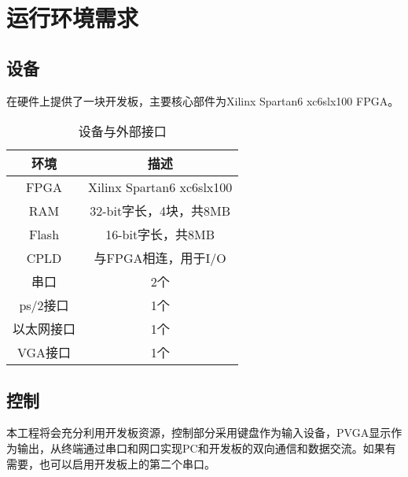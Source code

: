 \section{运行环境需求}
\subsection{设备}
在硬件上提供了一块开发板，主要核心部件为Xilinx Spartan6 xc6slx100 FPGA。
\begin{table}[H]
	\centering
	\caption{设备与外部接口}
	\begin{tabular}{|c|c|}
		\hline
		环境 & 描述 \\
		\hline
		FPGA & Xilinx Spartan6 xc6slx100 \\
		\hline
		RAM & 32-bit字长，4块，共8MB \\
		\hline
		Flash & 16-bit字长，共8MB \\
		\hline
		CPLD & 与FPGA相连，用于I/O \\
		\hline
		串口 & 2个 \\
		\hline
		ps/2接口 & 1个 \\
		\hline
		以太网接口 & 1个 \\
		\hline
		VGA接口 & 1个 \\
		\hline
	\end{tabular}
\end{table}
\subsection{控制}
本工程将会充分利用开发板资源，控制部分采用键盘作为输入设备，PVGA显示作为输出，从终端通过串口和网口实现PC和开发板的双向通信和数据交流。如果有需要，也可以启用开发板上的第二个串口。

